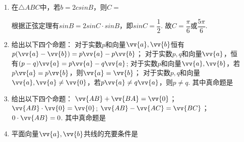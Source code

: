\begin{enumerate}
        \item 在$\triangle ABC$中，若$b = 2csinB$，则$C = $
        \begin{jieda}
            根据正弦定理有$sinB = 2sinC \cdot sinB$，即$sinC = \dfrac{1}{2}$. 故$C = \dfrac{\pi}{6}$或$\dfrac{5\pi}{6}$.
        \end{jieda}
        \item 给出以下四个命题：
         对于实数$p$和向量$\vv{a}, \vv{b}$恒有$p(\vv{a} - \vv{b}) = p\vv{a} - p\vv{b}$；
        对于实数$p, q$和向量$\vv{a}$，恒有$(p-q)\vv{a} = p\vv{a} - q\vv{a}$;
        对于实数$p$和向量$\vv{a}, \vv{b}$，若$p\vv{a} = p\vv{b}$，则$\vv{a} = \vv{b}$；
        对于实数$p, q$和向量$\vv{a}, \vv{a} \neq \vv{0}$，若$p \vv{a} \neq q \vv{a}$，则$p \neq q$. 
        其中真命题是
        \begin{jieda}
        \end{jieda}
        \item 给出以下四个命题：
         $\vv{AB} + \vv{BA} = \vv{0}$；
         $\vv{AB} \cdot \vv{0} = \vv{0}$;
         $\vv{AB} - \vv{AC} = \vv{BC}$；
         $0 \cdot \vv{AB} = 0$. 其中真命题是
        \begin{jieda}
        \end{jieda}
        \item 平面向量$\vv{a}, \vv{b}$共线的充要条件是

\end{enumerate}

